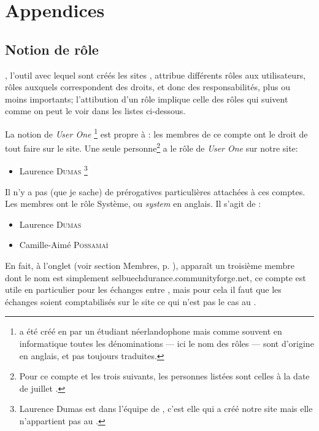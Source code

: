 \setcounter{footnote}{0}
\chapter{Appendices}

\section[Notion de rôle]{Notion de rôle}\label{sec:responsabilitesSite}

\drupal, l'outil avec lequel sont créés les sites \CF, attribue différents rôles aux utilisateurs, rôles auxquels correspondent des droits, et donc des responsabilités, plus ou moins importants; l'attibution d'un rôle implique celle des rôles qui suivent comme on peut le voir dans les listes ci-dessous.


La notion de \emph{User One}%
\footnote{\drupal{} a été créé en  par un étudiant néerlandophone mais comme souvent en informatique toutes les dénominations --- ici le nom des rôles --- sont d'origine en anglais, et pas toujours traduites.} 
est propre à \drupal: les membres de ce compte ont le droit de tout faire sur le site. Une seule personne\footnote{Pour ce compte et les trois suivants, les personnes listées sont celles à la date de juillet .} a le rôle de \emph{User One} sur notre site:

\begin{itemize}
    \item Laurence \textsc{Dumas}%
    \footnote{Laurence Dumas est dans l'équipe de \CF, c'est elle qui a créé notre site mais elle n'appartient pas au \CdS.}
\end{itemize}

\label{sec:comptesSel}

Il n'y a pas (que je sache) de prérogatives particulières attachées à ces comptes. Les membres ont le rôle \og Système\fg, ou \emph{system} en anglais. Il s'agit de :

\begin{itemize}
    \item Laurence \textsc{Dumas}
    \item Camille-Aimé \textsc{Possamaï}
\end{itemize}

En fait, à l'onglet  (voir section \og Membres\fg, p. \pageref{sec:membres}), apparaît un troisième membre dont le nom est simplement \og selbuechdurance.communityforge.net\fg, ce compte est utile en particulier pour les échanges entre \sel, mais pour cela il faut que les échanges soient comptabilisés sur le site ce qui n'est pas le cas au \CdS.

